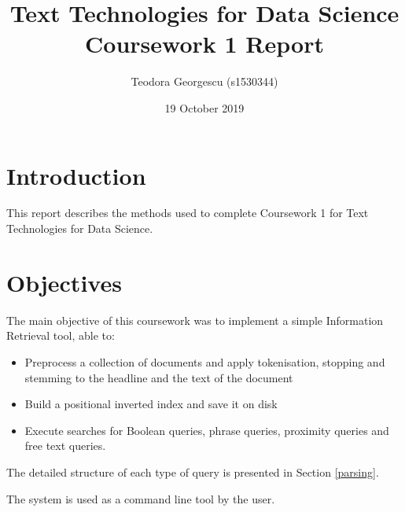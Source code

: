 \documentclass[11pt]{article}
\title{Text Technologies for Data Science \\ Coursework 1 Report }
\author{Teodora Georgescu (s1530344)}
\date{19 October 2019}
\begin{document}
\maketitle

\begin{multicols}{2}

\section{Introduction} \label{introduction}
This report describes the methods used to complete Coursework 1 for Text Technologies for Data Science. 


\section{Objectives} \label{objectives}
The main objective of this coursework was to implement a simple Information Retrieval tool, able to:
\begin{itemize}
	\item Preprocess a collection of documents and apply tokenisation, stopping and stemming to the headline and the text of the document
	\item Build a positional inverted index and save it on disk
	\item Execute searches for Boolean queries, phrase queries, proximity queries and free text queries.
\end{itemize}

The detailed structure of each type of query is presented in Section \ref{parsing}.

The system is used as a command line tool by the user.


\end{multicols}
\end{document}
